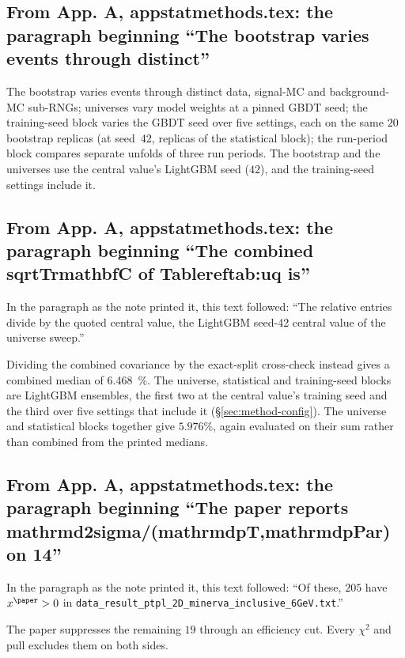 \subsection{From App. A, appstatmethods.tex: the paragraph beginning ``The bootstrap varies events through distinct''}
The bootstrap varies events through distinct data, signal-MC and background-MC sub-RNGs; universes vary model weights at a pinned GBDT seed; the training-seed block varies the GBDT seed over five settings, each on the same $20$ bootstrap replicas (at seed~42, replicas of the statistical block); the run-period block compares separate unfolds of three run periods. The bootstrap and the universes use the central value's LightGBM seed ($42$), and the training-seed settings include it.

\subsection{From App. A, appstatmethods.tex: the paragraph beginning ``The combined sqrtTrmathbfC of Tablereftab:uq is''}
In the paragraph as the note printed it, this text followed: ``The relative entries divide by the quoted central value, the LightGBM seed-42 central value of the universe sweep.''\par
Dividing the combined covariance by the exact-split cross-check instead gives a combined median of \SI{6.468}{\percent}. The universe, statistical and training-seed blocks are LightGBM ensembles, the first two at the central value's training seed and the third over five settings that include it (\S\ref{sec:method-config}). The universe and statistical blocks together give $5.976\%$, again evaluated on their sum rather than combined from the printed medians.

\subsection{From App. A, appstatmethods.tex: the paragraph beginning ``The paper reports mathrmd2sigma/(mathrmdpT,mathrmdpPar) on 14''}
In the paragraph as the note printed it, this text followed: ``Of these, $205$ have $x^{\paper}>0$ in \texttt{data\_result\_ptpl\_2D\_minerva\_inclusive\_6GeV.txt}.''\par
The paper suppresses the remaining $19$ through an efficiency cut. Every $\chi^{2}$ and pull excludes them on both sides.

